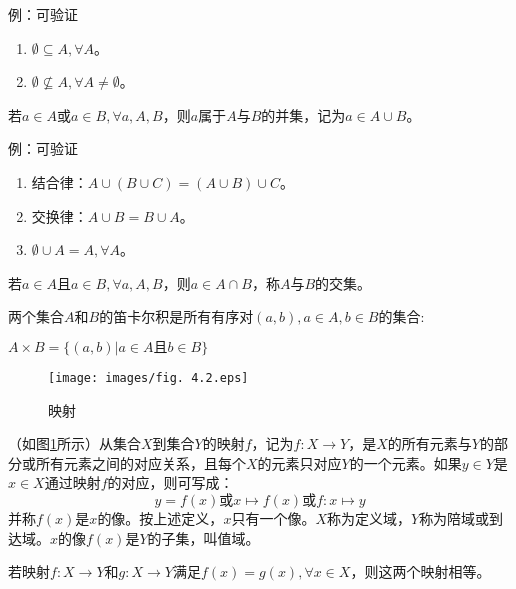 \documentclass[main.tex]{subfiles}
\begin{document}
例：可验证

\begin{enumerate}
    \item $\emptyset\subseteq A,\forall A$。
    \item $\emptyset\not\subseteq A,\forall A\neq\emptyset$。
\end{enumerate}


\begin{definition}[并集]
若$a\in A$或$a\in B,\forall a,A,B$，则$a$属于$A$与$B$的并集，记为$a\in A\cup B$。
\end{definition}

例：可验证

\begin{enumerate}
    \item 结合律：$A\cup\left(B\cup C\right)=\left(A\cup B\right)\cup C$。
    \item 交换律：$A\cup B=B\cup A$。
    \item $\emptyset\cup A=A,\forall A$。
\end{enumerate}


\begin{definition}[交集]
若$a\in A$且$a\in B,\forall a,A,B$，则$a\in A\cap B$，称$A$与$B$的交集。
\end{definition}

\begin{definition}[笛卡尔积]
两个集合$A$和$B$的笛卡尔积是所有有序对$\left(a,b\right),a\in A,b\in B$的集合:

$A\times B=\{\left(a,b\right)|a\in A\text{且}b\in B\}$
\end{definition}

\begin{figure}[htbp]
\centering
\texttt{[image: images/fig. 4.2.eps]}
\caption{映射}
\label{fig:4.2}
\end{figure}

\begin{definition}[映射]
（如图\ref{fig:4.2}所示）从集合$X$到集合$Y$的映射$f$，记为$f:X\rightarrow Y$，是$X$的所有元素与$Y$的部分或所有元素之间的对应关系，且每个$X$的元素只对应$Y$的一个元素。如果$y\in Y$是$x\in X$通过映射$f$的对应，则可写成：
\[y=f\left(x\right)\text{或}x\mapsto f\left(x\right)\text{或}f:x\mapsto y\]
并称$f\left(x\right)$是$x$的像。按上述定义，$x$只有一个像。$X$称为定义域，$Y$称为陪域或到达域。$x$的像$f\left(x\right)$是$Y$的子集，叫值域。
\end{definition}

\begin{definition}[映射的相等]
若映射$f:X\rightarrow Y$和$g:X\rightarrow Y$满足$f\left(x\right)=g\left(x\right),\forall x\in X$，则这两个映射相等。
\end{definition}
\end{document}
